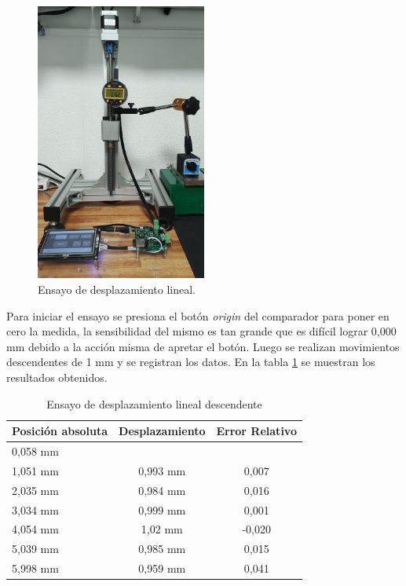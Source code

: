\begin{figure}[h!]
\centering 
\includegraphics[width=0.5\textwidth]{./Figures/desplazamiento_lineal.png}
\caption{Ensayo de desplazamiento lineal.}
\label{fig:desplazamiento_lineal}
\end{figure}


Para iniciar el ensayo se presiona el botón \textit{origin} del comparador para poner en cero la medida, la sensibilidad del mismo es tan grande que es difícil lograr 0,000 mm debido a la acción misma  de apretar el botón. Luego se realizan movimientos descendentes de 1 mm y se registran los datos.
En la tabla \ref{tab:ensayo_desplazamiento_des} se muestran los resultados obtenidos.

\begin{table}[h!]
	\centering
	\caption[Ensayo de desplazamiento]{Ensayo de desplazamiento lineal descendente}
	\begin{tabular}{l c c }    
		\toprule
		\textbf{Posición absoluta}     & \textbf{Desplazamiento} & \textbf{Error Relativo} \\
		\midrule
		0,058 mm	& 	        	& 	 			 	\\		
		1,051 mm    & 	0,993 mm    	& 	0,007				\\
		2,035 mm 	& 	0,984 mm	    & 	0,016 				\\
		3,034 mm	& 	0,999 mm	    & 	0,001 			\\
		4,054 mm 	& 	1,02 mm         & 	-0,020					\\
		5,039 mm 	& 	0,985 mm	    & 	0,015					\\
		5,998 mm 	& 	0,959 mm        & 	0,041 			\\
		\bottomrule
		\hline
	\end{tabular}
	\label{tab:ensayo_desplazamiento_des}
\end{table}

